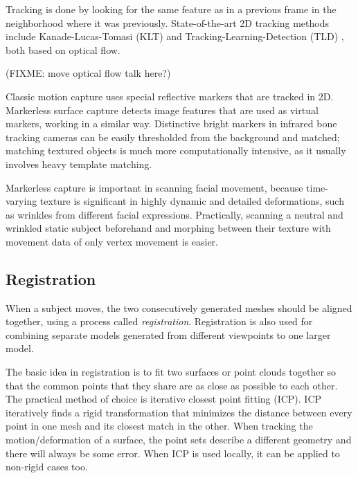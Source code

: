 Tracking is done by looking for the same feature as in a previous frame in the neighborhood where it was previously.
State-of-the-art 2D tracking methods include Kanade-Lucas-Tomasi (KLT) \cite{KLT} and Tracking-Learning-Detection (TLD) \cite{TLD}, both based on optical flow.

(FIXME: move optical flow talk here?)


Classic motion capture uses special reflective markers that are tracked in 2D.
Markerless surface capture detects image features that are used as virtual markers, working in a similar way.
Distinctive bright markers in infrared bone tracking cameras can be easily thresholded from the background and matched; matching textured objects is much more computationally intensive, as it usually involves heavy template matching.


Markerless capture is important in scanning facial movement, because time-varying texture is significant in highly dynamic and detailed deformations, such as wrinkles from different facial expressions.
Practically, scanning a neutral and wrinkled static subject beforehand and morphing between their texture with movement data of only vertex movement is easier.


\subsection{Registration} %

When a subject moves, the two consecutively generated meshes should be aligned together, using a process called \emph{registration}.
Registration is also used for combining separate models generated from different viewpoints to one larger model.

The basic idea in registration is to fit two surfaces or point clouds together so that the common points that they share are as close as possible to each other.
The practical method of choice is iterative closest point fitting (ICP).
ICP iteratively finds a rigid transformation that minimizes the distance between every point in one mesh and its closest match in the other.
When tracking the motion/deformation of a surface, the point sets describe a different geometry and there will always be some error.
When ICP is used locally, it can be applied to non-rigid cases too. \cite{brown2007global}


